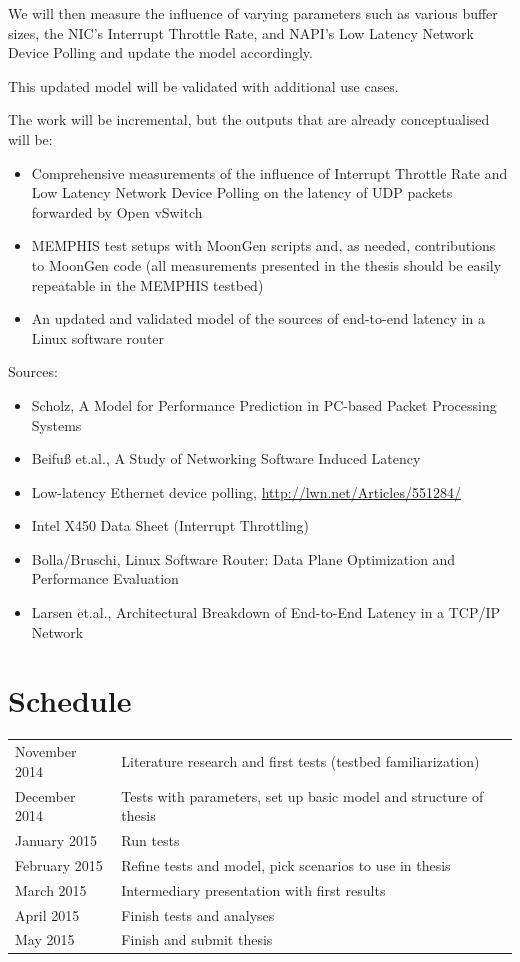 \documentclass[a4paper]{article}
\begin{document}
We will then measure the influence of varying parameters such as various buffer sizes, the NIC's Interrupt Throttle Rate, and NAPI's Low Latency Network Device Polling and update the model accordingly.

This updated model will be validated with additional use cases.
\vspace{1em}

The work will be incremental, but the outputs that are already conceptualised will be:

\begin{itemize}
  \item Comprehensive measurements of the influence of Interrupt Throttle Rate and Low Latency Network Device Polling on the latency of UDP packets forwarded by Open vSwitch
  \item MEMPHIS test setups with MoonGen scripts and, as needed, contributions to MoonGen code (all measurements presented in the thesis should be easily repeatable in the MEMPHIS testbed)
  \item An updated and validated model of the sources of end-to-end latency in a Linux software router
\end{itemize}

\vspace{1em}
Sources:
\begin{itemize}
  \item Scholz, A Model for Performance Prediction in PC-based Packet Processing Systems
  \item Beifuß et.al., A Study of Networking Software Induced Latency
  \item Low-latency Ethernet device polling, \url{http://lwn.net/Articles/551284/}
  \item Intel X450 Data Sheet (Interrupt Throttling)
  \item Bolla/Bruschi, Linux Software Router: Data Plane Optimization and Performance Evaluation
  \item Larsen et.al., Architectural Breakdown of End-to-End Latency in a TCP/IP Network
\end{itemize}


\section*{Schedule}

\begin{tabular}{ll}
  November 2014 & Literature research and first tests (testbed familiarization)\\
  December 2014 & Tests with parameters, set up basic model and structure of thesis\\
  January 2015  & Run tests\\
  February 2015 & Refine tests and model, pick scenarios to use in thesis\\
  March 2015    & Intermediary presentation with first results\\
  April 2015    & Finish tests and analyses\\
  May 2015      & Finish and submit thesis\\
\end{tabular}
\end{document}
